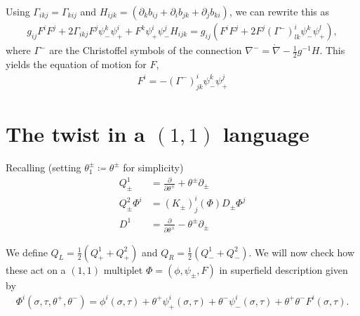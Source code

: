\documentclass{article}
\newcommand{\lc}{\mathring{\n}}
\newcommand{\p}{\partial}
\newcommand{\n}{\nabla}
\theoremstyle{definition}
\theoremstyle{definition}
\theoremstyle{remark}
\begin{document}
Using $\Gamma_{ikj}=\Gamma_{kij}$ and $H_{ijk}=(\p_kb_{ij}+\p_ib_{jk}+\p_jb_{ki})$, we can rewrite this as
\begin{align*}
g_{ij}F^iF^j+2\Gamma_{ikj}F^j\psi^k_-\psi_+^i+F^k\psi^i_+\psi^j_-H_{ijk}=g_{ij}(F^iF^j+2F^j(\Gamma^-)_{lk}^i\psi_-^k\psi_+^l),
\end{align*}
where $\Gamma^-$ are the Christoffel symbols of the connection $\n^-=\lc-\frac{1}{2}g^{-1}H$. This yields the equation of motion for $F$,
\begin{align}
F^i=-(\Gamma^-)^i_{jk}\psi^k_-\psi^j_+
\end{align}





\section*{The twist in a $(1,1)$ language}
Recalling (setting $\theta^\pm_1\coloneqq \theta^\pm$ for simplicity)
\begin{align*}
Q^1_\pm&=\frac{\p}{\p\theta^\pm}+\theta^\pm\p_\pm\\
Q^2_\pm\Phi^i&=(K_\pm)^i_j(\Phi)D_\pm\Phi^j\\
D^1&=\frac{\p}{\p\theta^\pm}-\theta^\pm\p_\pm
\end{align*}

We define $Q_L=\frac{1}{2}( Q^1_++Q^2_+)$ and $Q_R=\frac{1}{2}( Q^1_-+Q^2_-)$. We will now check how these act on a $(1,1)$ multiplet $\Phi=(\phi,\psi_\pm,F)$ in superfield description given by 
\begin{align*}
\Phi^i(\sigma,\tau,\theta^+,\theta^-)=\phi^i(\sigma,\tau)+\theta^+\psi^i_+(\sigma,\tau)+\theta^-\psi^i_-(\sigma,\tau)+\theta^+\theta^-F^i(\sigma,\tau).
\end{align*}
\end{document}
